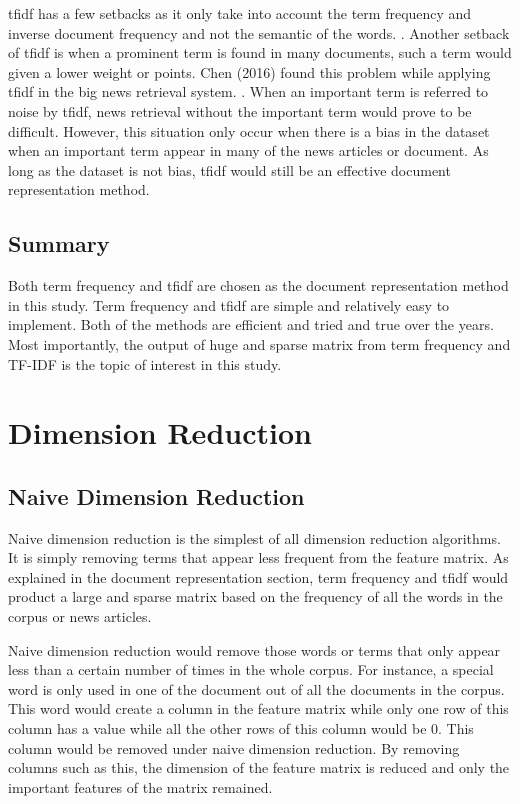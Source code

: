 \Ac{tfidf} has a few setbacks as it only take into account the term frequency and inverse document frequency and not the semantic of the words. \cite{tfidfDrawback}. Another setback of \ac{tfidf} is when a prominent term is found in many documents, such a term would given a lower weight or points. Chen (2016) found this problem while applying \ac{tfidf} in the big news retrieval system. \cite{improvedtfidf}. When an important term is referred to noise by \ac{tfidf}, news retrieval without the important term would prove to be difficult. However, this situation only occur when there is a bias in the dataset when an important term appear in many of the news articles or document. As long as the dataset is not bias, \ac{tfidf} would still be an effective document representation method.\\

\subsection{Summary}
Both term frequency and \ac{tfidf} are chosen as the document representation method in this study. Term frequency and \ac{tfidf} are simple and relatively easy to implement. Both of the methods are efficient and tried and true over the years. Most importantly, the output of huge and sparse matrix from term frequency and TF-IDF is the topic of interest in this study.


\section{Dimension Reduction}
\subsection{Naive Dimension Reduction}
Naive dimension reduction is the simplest of all dimension reduction algorithms. It is simply removing terms that appear less frequent from the feature matrix. As explained in the document representation section, term frequency and \ac{tfidf} would product a large and sparse matrix based on the frequency of all the words in the corpus or news articles. 

Naive dimension reduction would remove those words or terms that only appear less than a certain number of times in the whole corpus. For instance, a special word is only used in one of the document out of all the documents in the corpus. This word would create a column in the feature matrix while only one row of this column has a value while all the other rows of this column would be 0. This column would be removed under naive dimension reduction. By removing columns such as this, the dimension of the feature matrix is reduced and only the important features of the matrix remained.

